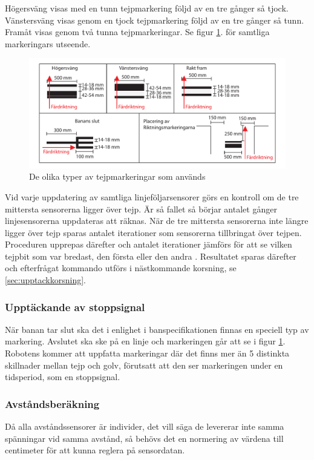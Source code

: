 Högersväng visas med en tunn tejpmarkering följd av en tre gånger så tjock.
Vänstersväng visas genom en tjock tejpmarkering följd av en tre gånger så tunn.
Framåt visas genom två tunna tejpmarkeringar. Se figur \ref{fig:tejpmarkeringar}.
för samtliga markeringars utseende.

\begin{figure}[H]
  \centering
 \includegraphics[angle=0,scale=0.5]{bilder/tejpmarkeringar.pdf}
  \caption{De olika typer av tejpmarkeringar som används}
  \label{fig:tejpmarkeringar}
\end{figure}


Vid varje uppdatering av samtliga linjeföljarsensorer görs en kontroll om de 
tre mittersta sensorerna ligger över tejp. Är så fallet så börjar antalet 
gånger linjesensorerna uppdateras att räknas. När de tre mittersta sensorerna 
inte längre ligger över tejp sparas antalet iterationer som sensorerna 
tillbringat över tejpen. Proceduren upprepas därefter och antalet iterationer 
jämförs för att se vilken tejpbit som var bredast, den första eller den andra
. Resultatet sparas därefter och efterfrågat kommando utförs i nästkommande 
korsning, se \ref{sec:upptackkorsning}.

\subsubsection{Upptäckande av stoppsignal}
När banan tar slut ska det i enlighet i banspecifikationen finnas en speciell typ av 
markering. Avslutet ska ske på en linje och markeringen går att se i figur \ref{fig:tejpmarkeringar}.
Robotens kommer att uppfatta markeringar där det finns mer än 5 distinkta skillnader mellan tejp och golv, förutsatt att den ser markeringen under en tidsperiod, som en stoppsignal. 

\subsubsection{Avståndsberäkning}
Då alla avståndssensorer är individer, det vill säga de levererar inte samma spänningar vid
samma avstånd, så behövs det en normering av värdena till centimeter för att kunna reglera
på sensordatan. 

